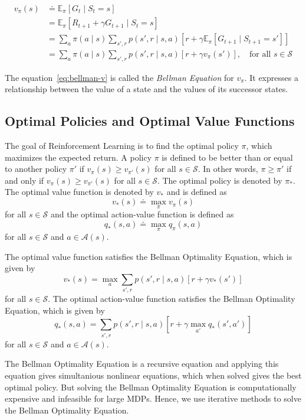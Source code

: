 \begin{align}
    v_\pi(s) &\doteq \mathbb{E}_\pi\left[G_t\mid S_t=s\right] \\
    &= \mathbb{E}_\pi\left[R_{t+1} + \gamma G_{t+1} \mid S_t=s\right] \\
    &= \sum_{a}\pi(a\mid s)\sum_{s',r}p(s',r\mid s,a)\left[r + \gamma\mathbb{E}_\pi\left[G_{t+1}\mid S_{t+1}=s'\right]\right] \\
    &= \sum_{a}\pi(a\mid s)\sum_{s',r}p(s',r\mid s,a)\left[r + \gamma v_\pi(s')\right], \quad \text{for all } s\in\mathcal{S}\label{eq:bellman-v}
\end{align}

The equation~\ref{eq:bellman-v} is called the \textit{Bellman Equation} for $v_\pi$. It expresses a relationship between the value of a state and the values of its successor states.

\subsection{Optimal Policies and Optimal Value Functions}

The goal of Reinforcement Learning is to find the optimal policy $\pi$, which maximizes the expected return. A policy $\pi$ is defined to be better than or equal to another policy $\pi'$ if $v_\pi(s) \geq v_{\pi'}(s)$ for all $s\in\mathcal{S}$. In other words, $\pi \geq \pi'$ if and only if $v_\pi(s) \geq v_{\pi'}(s)$ for all $s\in\mathcal{S}$. The optimal policy is denoted by $\pi_\ast$. The optimal value function is denoted by $v_\ast$ and is defined as\begin{equation}
    v_\ast(s) \doteq \max_\pi v_\pi(s)
\end{equation} for all $s\in\mathcal{S}$ and the optimal action-value function is defined as\begin{equation}
    q_\ast(s, a) \doteq \max_\pi q_\pi(s, a)
\end{equation} for all $s\in\mathcal{S}$ and $a\in\mathcal{A}(s)$.

The optimal value function satisfies the Bellman Optimality Equation, which is given by\begin{equation}
    v_\ast(s) = \max_a\sum_{s',r}p(s',r\mid s,a)\left[r + \gamma v_\ast(s')\right]
\end{equation} for all $s\in\mathcal{S}$. The optimal action-value function satisfies the Bellman Optimality Equation, which is given by\begin{equation}
    q_\ast(s, a) = \sum_{s',r}p(s',r\mid s,a)\left[r + \gamma\max_{a'}q_\ast(s', a')\right]
\end{equation} for all $s\in\mathcal{S}$ and $a\in\mathcal{A}(s)$.

The Bellman Optimality Equation is a recursive equation and applying this equation gives simultanious nonlinear equations, which when solved gives the best optimal policy. But solving the Bellman Optimality Equation is computationally expensive and infeasible for large MDPs. Hence, we use iterative methods to solve the Bellman Optimality Equation.
